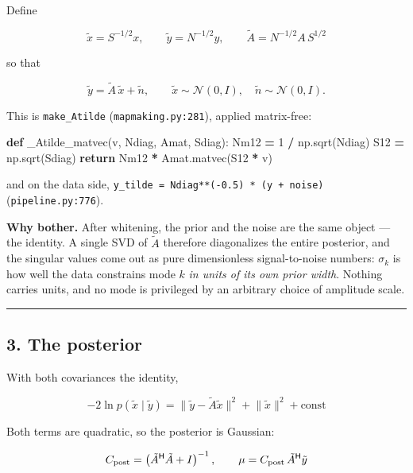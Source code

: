 \documentclass[
  11pt,
]{article}
\newenvironment{Shaded}{\begin{snugshade}}{\end{snugshade}}
\newcommand{\ControlFlowTok}[1]{\textcolor[rgb]{0.13,0.29,0.53}{\textbf{#1}}}
\newcommand{\DecValTok}[1]{\textcolor[rgb]{0.00,0.00,0.81}{#1}}
\newcommand{\KeywordTok}[1]{\textcolor[rgb]{0.13,0.29,0.53}{\textbf{#1}}}
\newcommand{\NormalTok}[1]{#1}
\newcommand{\OperatorTok}[1]{\textcolor[rgb]{0.81,0.36,0.00}{\textbf{#1}}}
\begin{document}
Define

\[ \tilde{x} = S^{-1/2} x, \qquad \tilde{y} = N^{-1/2} y, \qquad \tilde{A} = N^{-1/2} A\, S^{1/2} \]

so that

\[ \tilde{y} = \tilde{A}\,\tilde{x} + \tilde{n}, \qquad \tilde{x} \sim \mathcal{N}(0, I), \quad \tilde{n} \sim \mathcal{N}(0, I). \]

This is \texttt{make\_Atilde} (\texttt{mapmaking.py:281}), applied
matrix-free:

\begin{Shaded}
\begin{Highlighting}[]
\KeywordTok{def}\NormalTok{ \_Atilde\_matvec(v, Ndiag, Amat, Sdiag):}
\NormalTok{    Nm12 }\OperatorTok{=} \DecValTok{1} \OperatorTok{/}\NormalTok{ np.sqrt(Ndiag)}
\NormalTok{    S12 }\OperatorTok{=}\NormalTok{ np.sqrt(Sdiag)}
    \ControlFlowTok{return}\NormalTok{ Nm12 }\OperatorTok{*}\NormalTok{ Amat.matvec(S12 }\OperatorTok{*}\NormalTok{ v)}
\end{Highlighting}
\end{Shaded}

and on the data side,
\texttt{y\_tilde\ =\ Ndiag**(-0.5)\ *\ (y\ +\ noise)}
(\texttt{pipeline.py:776}).

\textbf{Why bother.} After whitening, the prior and the noise are the
same object --- the identity. A single SVD of \(\tilde{A}\) therefore
diagonalizes the entire posterior, and the singular values come out as
pure dimensionless signal-to-noise numbers: \(\sigma_k\) is how well the
data constrains mode \(k\) \emph{in units of its own prior width}.
Nothing carries units, and no mode is privileged by an arbitrary choice
of amplitude scale.

\begin{center}\rule{0.5\linewidth}{0.5pt}\end{center}

\hypertarget{3-the-posterior}{%
\subsection{3. The posterior}\label{3-the-posterior}}

With both covariances the identity,

\[ -2 \ln p(\tilde{x} \mid \tilde{y}) = \lVert \tilde{y} - \tilde{A}\tilde{x} \rVert^2 + \lVert \tilde{x} \rVert^2 + \text{const} \]

Both terms are quadratic, so the posterior is Gaussian:

\[ C_{\rm post} = \left(\tilde{A}^{\mathsf H}\tilde{A} + I\right)^{-1}, \qquad \mu = C_{\rm post}\,\tilde{A}^{\mathsf H} \tilde{y} \]
\end{document}
